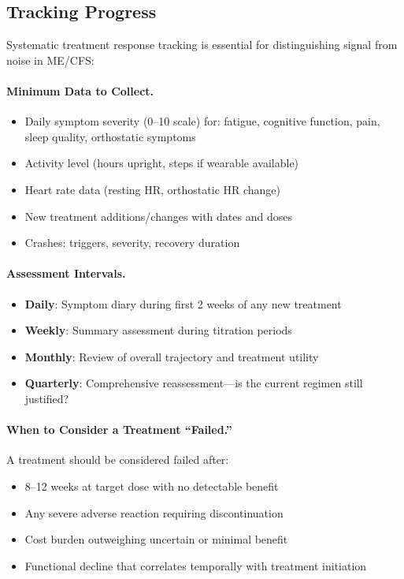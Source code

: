 \subsection{Tracking Progress}
\label{subsec:tracking-progress}

Systematic treatment response tracking is essential for distinguishing signal from noise in ME/CFS:

\paragraph{Minimum Data to Collect.}
\begin{itemize}
    \item Daily symptom severity (0--10 scale) for: fatigue, cognitive function, pain, sleep quality, orthostatic symptoms
    \item Activity level (hours upright, steps if wearable available)
    \item Heart rate data (resting HR, orthostatic HR change)
    \item New treatment additions/changes with dates and doses
    \item Crashes: triggers, severity, recovery duration
\end{itemize}

\paragraph{Assessment Intervals.}
\begin{itemize}
    \item \textbf{Daily}: Symptom diary during first 2 weeks of any new treatment
    \item \textbf{Weekly}: Summary assessment during titration periods
    \item \textbf{Monthly}: Review of overall trajectory and treatment utility
    \item \textbf{Quarterly}: Comprehensive reassessment---is the current regimen still justified?
\end{itemize}

\paragraph{When to Consider a Treatment ``Failed.''}
A treatment should be considered failed after:
\begin{itemize}
    \item 8--12 weeks at target dose with no detectable benefit
    \item Any severe adverse reaction requiring discontinuation
    \item Cost burden outweighing uncertain or minimal benefit
    \item Functional decline that correlates temporally with treatment initiation
\end{itemize}

